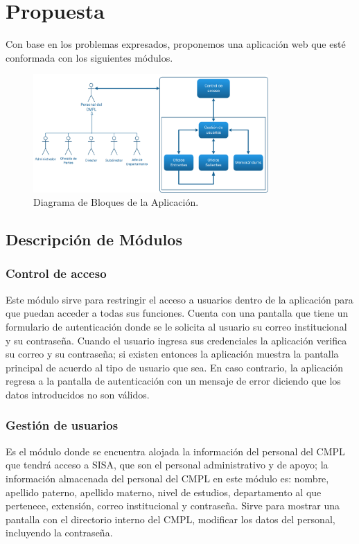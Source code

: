 \section{Propuesta}

Con base en los problemas expresados, proponemos una aplicación web que esté conformada con los siguientes módulos. \\ 

	\begin{figure}[htbp!]
		\centering
			\includegraphics[width=0.8\textwidth]{images/diagramabloques}
		\caption{Diagrama de Bloques de la Aplicación.}
	\end{figure}

\subsection{Descripción de Módulos}

\subsubsection{Control de acceso}

Este módulo sirve para restringir el acceso a usuarios dentro de la aplicación para que puedan acceder a todas sus funciones. Cuenta con una pantalla que tiene un formulario de autenticación donde se le solicita al usuario su correo institucional y su contraseña. Cuando el usuario ingresa sus credenciales la aplicación verifica su correo y su contraseña; si existen entonces la aplicación muestra la pantalla principal de acuerdo al tipo de usuario que sea. En caso contrario, la aplicación regresa a la pantalla de autenticación con un mensaje de error diciendo que los datos introducidos no son válidos.\\

\subsubsection{Gestión de usuarios}
Es el módulo donde se encuentra alojada la información del personal del CMPL que tendrá acceso a SISA, que son el personal administrativo y de apoyo; la información almacenada del personal del CMPL en este módulo es: nombre, apellido paterno, apellido materno, nivel de estudios, departamento al que pertenece, extensión, correo institucional y contraseña. Sirve para mostrar una pantalla con el directorio interno del CMPL, modificar los datos del personal, incluyendo la contraseña.\\

